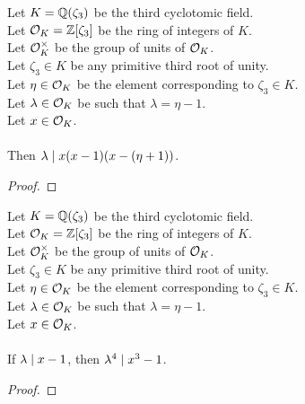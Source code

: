 \begin{lemma}
    \label{lmm:lambda_dvd_mul_sub_one_mul_sub_eta_add_one}
    \leanok
    Let $K = \mathbb{Q}(\zeta_3)$ be the third cyclotomic field. \\
    Let $\mathcal{O}_K = \mathbb{Z}[\zeta_3]$ be the ring of integers of $K$. \\
    Let $\mathcal{O}^\times_K$ be the group of units of $\mathcal{O}_K$. \\
    Let $\zeta_3 \in K$ be any primitive third root of unity. \\
    Let $\eta \in \mathcal{O}_K$ be the element corresponding to $\zeta_3 \in K$. \\
    Let $\lambda \in \mathcal{O}_K$ be such that $\lambda = \eta -1$. \\
    Let $x \in \mathcal{O}_K$. \\\\
    Then $\lambda \mid x(x - 1)(x - (\eta + 1))$.
\end{lemma}
\begin{proof}
    \leanok
\end{proof}

\begin{lemma}
    \label{lmm:lambda_pow_four_dvd_cube_sub_one_of_dvd_sub_one}
    \leanok
    Let $K = \mathbb{Q}(\zeta_3)$ be the third cyclotomic field. \\
    Let $\mathcal{O}_K = \mathbb{Z}[\zeta_3]$ be the ring of integers of $K$. \\
    Let $\mathcal{O}^\times_K$ be the group of units of $\mathcal{O}_K$. \\
    Let $\zeta_3 \in K$ be any primitive third root of unity. \\
    Let $\eta \in \mathcal{O}_K$ be the element corresponding to $\zeta_3 \in K$. \\
    Let $\lambda \in \mathcal{O}_K$ be such that $\lambda = \eta -1$. \\
    Let $x \in \mathcal{O}_K$. \\\\
    If $\lambda\mid x - 1$, then $\lambda^ 4 \mid x^3 - 1$.
\end{lemma}
\begin{proof}
    \leanok
\end{proof}

